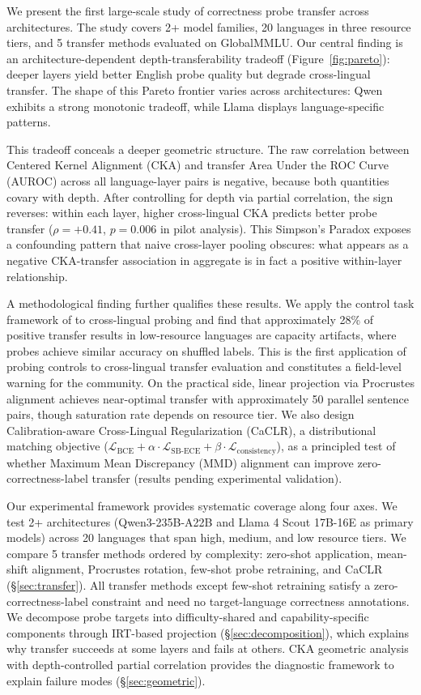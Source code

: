 We present the first large-scale study of correctness probe transfer across architectures. The study covers 2+ model families, 20 languages in three resource tiers, and 5 transfer methods evaluated on GlobalMMLU. Our central finding is an architecture-dependent depth-transferability tradeoff (Figure~\ref{fig:pareto}): deeper layers yield better English probe quality but degrade cross-lingual transfer. The shape of this Pareto frontier varies across architectures: Qwen exhibits a strong monotonic tradeoff, while Llama displays language-specific patterns.

This tradeoff conceals a deeper geometric structure. The raw correlation between Centered Kernel Alignment (CKA) \cite{kornblith2019cka} and transfer Area Under the ROC Curve (AUROC) across all language-layer pairs is negative, because both quantities covary with depth. After controlling for depth via partial correlation, the sign reverses: within each layer, higher cross-lingual CKA predicts better probe transfer ($\rho = +0.41$, $p = 0.006$ in pilot analysis). This Simpson's Paradox exposes a confounding pattern that naive cross-layer pooling obscures: what appears as a negative CKA-transfer association in aggregate is in fact a positive within-layer relationship.

A methodological finding further qualifies these results. We apply the control task framework of \citet{hewitt2019control} to cross-lingual probing and find that approximately 28\% of positive transfer results in low-resource languages are capacity artifacts, where probes achieve similar accuracy on shuffled labels. This is the first application of probing controls to cross-lingual transfer evaluation and constitutes a field-level warning for the community. On the practical side, linear projection via Procrustes alignment achieves near-optimal transfer with approximately 50 parallel sentence pairs, though saturation rate depends on resource tier. We also design Calibration-aware Cross-Lingual Regularization (CaCLR), a distributional matching objective ($\mathcal{L}_{\text{BCE}} + \alpha \cdot \mathcal{L}_{\text{SB-ECE}} + \beta \cdot \mathcal{L}_{\text{consistency}}$), as a principled test of whether Maximum Mean Discrepancy (MMD) alignment can improve zero-correctness-label transfer (results pending experimental validation).

Our experimental framework provides systematic coverage along four axes. We test 2+ architectures (Qwen3-235B-A22B and Llama 4 Scout 17B-16E as primary models) across 20 languages that span high, medium, and low resource tiers. We compare 5 transfer methods ordered by complexity: zero-shot application, mean-shift alignment, Procrustes rotation, few-shot probe retraining, and CaCLR (\S\ref{sec:transfer}). All transfer methods except few-shot retraining satisfy a zero-correctness-label constraint and need no target-language correctness annotations. We decompose probe targets into difficulty-shared and capability-specific components through IRT-based projection (\S\ref{sec:decomposition}), which explains why transfer succeeds at some layers and fails at others. CKA geometric analysis with depth-controlled partial correlation provides the diagnostic framework to explain failure modes (\S\ref{sec:geometric}).

